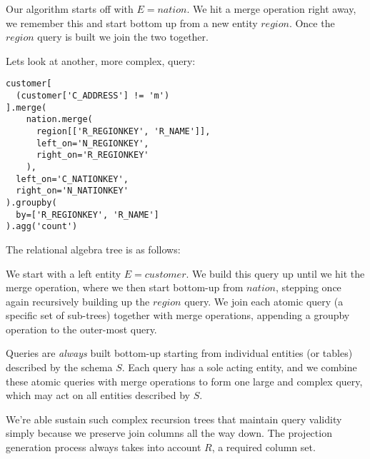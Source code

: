 \documentclass[10pt, twocolumn]{article}
\begin{document}
\spacing
\noindent
Our algorithm starts off with $E = nation$. We hit a merge operation right away, we remember this and start bottom up from a new entity $region$. Once the $region$ query is built we join the two together.

\spacing
\noindent
Lets look at another, more complex, query:

\begin{verbatim}
customer[
  (customer['C_ADDRESS'] != 'm')
].merge(
    nation.merge(
      region[['R_REGIONKEY', 'R_NAME']],
      left_on='N_REGIONKEY',
      right_on='R_REGIONKEY'
    ),
  left_on='C_NATIONKEY',
  right_on='N_NATIONKEY'
).groupby(
  by=['R_REGIONKEY', 'R_NAME']
).agg('count')
\end{verbatim}

\noindent
The relational algebra tree is as follows:

\spacing
{}

\spacing
\noindent
We start with a left entity $E = customer$. We build this query up until we hit the merge operation, where we then start bottom-up from $nation$, stepping once again recursively building up the $region$ query. We join each atomic query (a specific set of sub-trees) together with merge operations, appending a groupby operation to the outer-most query.

\spacing
\noindent
Queries are \textit{always} built bottom-up starting from individual entities (or tables) described by the schema $S$. Each query has a sole acting entity, and we combine these atomic queries with merge operations to form one large and complex query, which may act on all entities described by $S$.

\spacing
\noindent
We're able sustain such complex recursion trees that maintain query validity simply because we preserve join columns all the way down. The projection generation process always takes into account $R$, a required column set.
\end{document}
